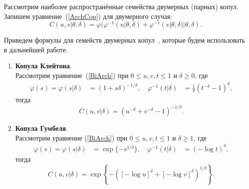 Рассмотрим наиболее распространённые семейства двумерных (парных) копул. 
Запишем уравнение~(\ref{ArchCop}) для двумерного случая:
\begin{equation} \label{BiArch}
    C(u, v|\theta, \delta) = \varphi (\varphi^{-1}(u|\theta, \delta) + \varphi^{-1}(v|\theta, \delta)|\theta, \delta).
\end{equation}

Приведем формулы для семейств двумерных копул~\cite{Joe1997}, которые будем использовать в дальнейшей работе. 

\begin{enumerate}
\item \textbf{Копула Клейтона}.\\
Рассмотрим уравнение~(\ref{BiArch}) при $0 \le u, v, t \le 1$ и $\delta \ge 0$, где
\begin{equation}
\begin{aligned}
    \varphi (s) = \varphi(s| \delta) &= (1 + s \delta)^{-1/\delta}, \quad %
    \varphi^{-1}(t| \delta) &= \frac{1}{\delta} (t^{-\delta} - 1)^\delta,
\end{aligned} \nonumber 
\end{equation}
тогда
\begin{equation}
    C(u,v|\delta) = (u^{-\delta} + v^{-\delta} - 1)^{-1/\delta}. \nonumber
\end{equation}

\item \textbf{Копула Гумбеля}.\\
Рассмотрим уравнение (\ref{BiArch}) при $0 \le u, v, t \le 1$ и $\delta \ge 1$, где
\begin{equation}
\begin{aligned}
    \varphi (s) = \varphi(s| \delta) &= \exp{\{-s^{1/\delta}\}}, \quad %
    \varphi^{-1}(t| \delta) &= (-\log{t})^\delta,
\end{aligned} \nonumber 
\end{equation}
тогда
\begin{equation}
    C(u,v|\delta) = \exp{\left\{-([-\log{u}]^\delta + [-\log{v}]^\delta)^{1/\delta}\right\}}. \nonumber
\end{equation}


\end{enumerate}
